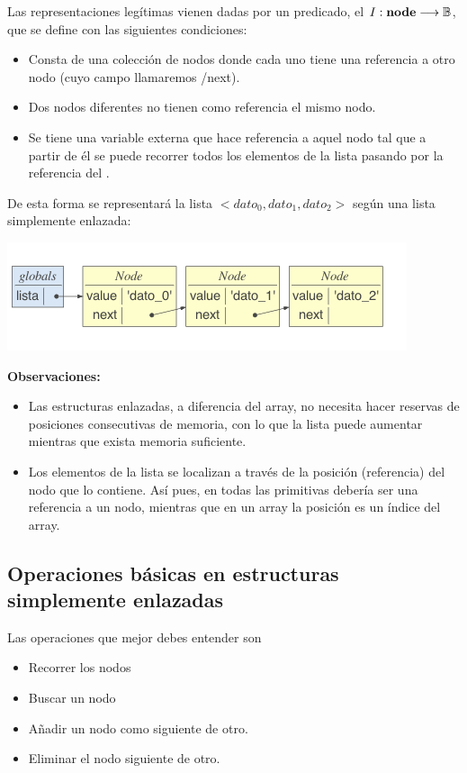 Las representaciones legítimas vienen dadas por un predicado,
el  
$I: \mbox{\textbf{node}} \longrightarrow \mathbb{B}$, que se define con las siguientes condiciones:
\begin{itemize}
\item Consta de una colección de nodos donde cada uno tiene una referencia a otro nodo (cuyo campo llamaremos /next).

\item Dos nodos diferentes no tienen como referencia  el mismo nodo.

\item Se tiene una variable externa que hace referencia a aquel nodo tal que a partir de él se puede recorrer todos los elementos de la lista pasando por la referencia del .
\end{itemize}


\begin{ejemplo}
De esta forma se representará la lista $<dato_0, dato_1, dato_2>$  según una lista simplemente enlazada:

\centerline{\includegraphics[width=.6\textwidth]{input/05-List-fig/ejemListaSingleLinked}}
\end{ejemplo}

\noindent \textbf{Observaciones:}
\begin{itemize}
\item 
Las estructuras enlazadas, a diferencia del array, no  necesita hacer reservas de posiciones consecutivas de memoria, con lo que la lista puede aumentar mientras que exista memoria suficiente. 

\item 
Los elementos  de la lista se localizan a través de la posición (referencia) del nodo  que lo contiene. Así pues,  en todas las primitivas debería ser una referencia a un nodo, mientras que en un array la posición es un índice del array.
\end{itemize}



\subsection*{Operaciones básicas en estructuras simplemente enlazadas} \label{subsec:operacionesBasicasSimplemente}
 Las  operaciones que mejor debes entender son
\begin{itemize}
\item Recorrer los nodos
\item Buscar un nodo
\item Añadir un nodo como siguiente de otro.
\item Eliminar el nodo siguiente de otro.
\end{itemize}

